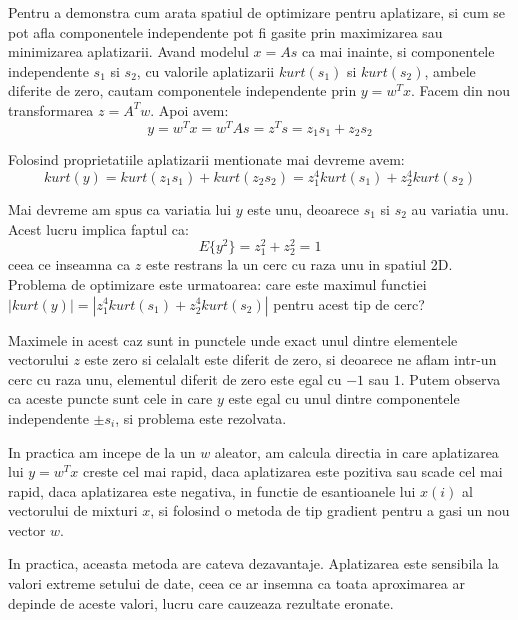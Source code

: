 \documentclass[12pt]{article}
\begin{document}
Pentru a demonstra cum arata spatiul de optimizare pentru aplatizare, si cum se pot afla componentele independente pot fi gasite prin maximizarea sau minimizarea aplatizarii. Avand modelul $x=As$ ca mai inainte, si componentele independente $s_1$ si $s_2$, cu valorile aplatizarii $kurt(s_1)$ si $kurt(s_2)$, ambele diferite de zero, cautam componentele independente prin $y=w^Tx$.
Facem din nou transformarea $z=A^Tw$. Apoi avem:
\begin{equation}
y=w^Tx=w^TAs=z^Ts=z_1s_1+z_2s_2
\end{equation}

Folosind proprietatiile aplatizarii mentionate mai devreme avem:
\begin{equation}
kurt(y)=kurt(z_1s_1)+kurt(z_2s_2)=z_1^4kurt(s_1)+z_2^4kurt(s_2)	
\end{equation}

Mai devreme am spus ca variatia lui $y$ este unu, deoarece $s_1$ si $s_2$ au variatia unu. Acest lucru implica faptul ca:
\begin{equation}
E\{y^2\}=z_1^2+z_2^2=1
\end{equation} 
ceea ce inseamna ca $z$ este restrans la un cerc cu raza unu in spatiul 2D. Problema de optimizare este urmatoarea: care este maximul functiei $|kurt(y)|=|z_1^4kurt(s_1)+z_2^4kurt(s_2)|$ pentru acest tip de cerc?

Maximele in acest caz sunt in punctele unde exact unul dintre elementele vectorului $z$ este zero si celalalt este diferit de zero, si deoarece ne aflam intr-un cerc cu raza unu, elementul diferit de zero este egal cu $-1$ sau $1$. Putem observa ca aceste puncte sunt cele in care $y$ este egal cu unul dintre componentele independente $\pm s_i$, si problema este rezolvata.

In practica am incepe de la un $w$ aleator, am calcula directia in care aplatizarea lui $y=w^Tx$ creste cel mai rapid, daca aplatizarea este pozitiva sau scade cel mai rapid, daca aplatizarea este negativa, in functie de esantioanele lui $x(i)$ al vectorului de mixturi $x$, si folosind o metoda de tip gradient pentru a gasi un nou vector $w$.

In practica, aceasta metoda are cateva dezavantaje. Aplatizarea este sensibila la valori extreme setului de date, ceea ce ar insemna ca toata aproximarea ar depinde de aceste valori, lucru care cauzeaza rezultate eronate.
\end{document}

